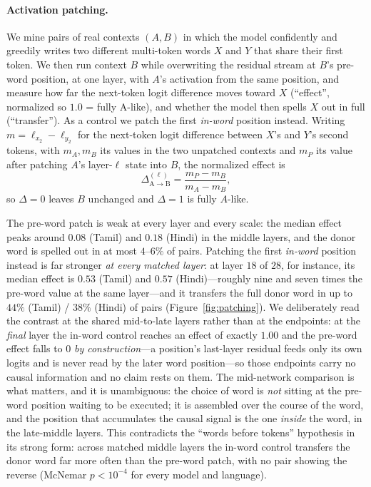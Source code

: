 \paragraph{Activation patching.} We mine pairs of real contexts $(A,B)$ in
which the model confidently and greedily writes two different multi-token words
$X$ and $Y$ that share their first token. We then run context $B$ while
overwriting the residual stream at $B$'s pre-word position, at one layer, with
$A$'s activation from the same position, and measure how far the next-token
logit difference moves toward $X$ (``effect'', normalized so $1.0$ = fully
A-like), and whether the model then spells $X$ out in full (``transfer''). As a
control we patch the first \emph{in-word} position instead. Writing
$m = \ell_{x_2} - \ell_{y_2}$ for the next-token logit difference between $X$'s
and $Y$'s second tokens, with $m_A,m_B$ its values in the two unpatched
contexts and $m_P$ its value after patching $A$'s layer-$\ell$ state into $B$,
the normalized effect is
\begin{equation}
\Delta_{\mathrm{A}\to\mathrm{B}}^{(\ell)} = \frac{m_P - m_B}{m_A - m_B},
\end{equation}
so $\Delta=0$ leaves $B$ unchanged and $\Delta=1$ is fully $A$-like.

The pre-word patch is weak at every layer and every scale: the median effect
peaks around $0.08$ (Tamil) and $0.18$ (Hindi) in the middle layers, and the
donor word is spelled out in at most $4$--$6\%$ of pairs. Patching the first
\emph{in-word} position instead is far stronger \emph{at every matched layer}:
at layer $18$ of $28$, for instance, its median effect is $0.53$ (Tamil) and
$0.57$ (Hindi)---roughly nine and seven times the pre-word value at the same
layer---and it transfers the full donor word in up to $44\%$ (Tamil) / $38\%$
(Hindi) of pairs (Figure~\ref{fig:patching}). We deliberately read the contrast
at the shared mid-to-late layers rather than at the endpoints: at the
\emph{final} layer the in-word control reaches an effect of exactly $1.00$ and
the pre-word effect falls to $0$ \emph{by construction}---a position's
last-layer residual feeds only its own logits and is never read by the later
word position---so those endpoints carry no causal information and no claim
rests on them. The mid-network comparison is what matters, and it is
unambiguous: the choice of word is \emph{not} sitting at the pre-word position
waiting to be executed; it is assembled over the course of the word, and the
position that accumulates the causal signal is the one \emph{inside} the word,
in the late-middle layers. This contradicts the ``words before tokens''
hypothesis in its strong form: across matched middle layers the in-word control
transfers the donor word far more often than the pre-word patch, with no pair
showing the reverse (McNemar $p<10^{-4}$ for every model and language).

